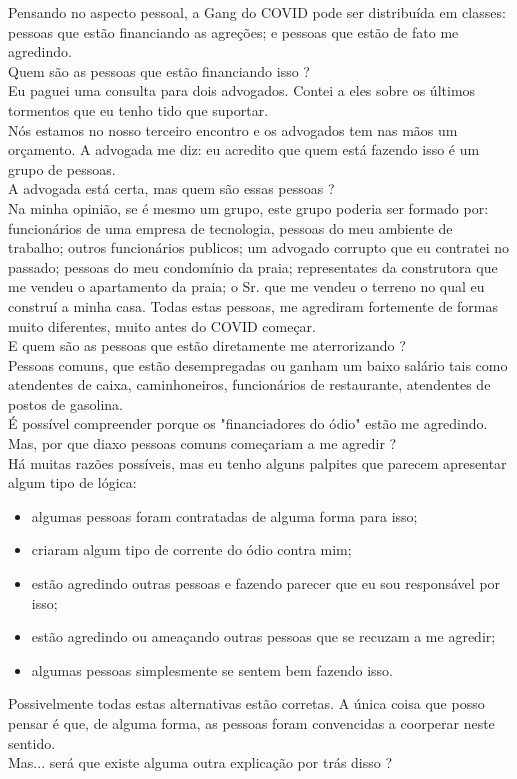 \documentclass[11pt]{book}
\begin{document}
Pensando no aspecto pessoal, a Gang do COVID pode ser distribuída em classes: pessoas que estão financiando as agreções; e pessoas que estão de fato me agredindo. \\

Quem são as pessoas que estão financiando isso ? \\

Eu paguei uma consulta para dois advogados. Contei a eles sobre os últimos tormentos que eu tenho tido que suportar. \\

Nós estamos no nosso terceiro encontro e os advogados tem nas mãos um orçamento. A advogada me diz: eu acredito que quem está fazendo isso é um grupo de pessoas. \\

A advogada está certa, mas quem são essas pessoas ? \\

Na minha opinião, se é mesmo um grupo, este grupo poderia ser formado por: funcionários de uma empresa de tecnologia, pessoas do meu ambiente de trabalho; outros funcionários publicos; um advogado corrupto que eu contratei no passado; pessoas do meu condomínio da praia; representates da construtora que me vendeu o apartamento da praia; o Sr. que me vendeu o terreno no qual eu construí a minha casa. Todas estas pessoas, me agrediram fortemente de formas muito diferentes, muito antes do COVID começar. \\

E quem são as pessoas que estão diretamente me aterrorizando ? \\

Pessoas comuns, que estão desempregadas ou ganham um baixo salário tais como atendentes de caixa, caminhoneiros, funcionários de restaurante, atendentes de postos de gasolina. \\

É possível compreender porque os "financiadores do ódio" estão me agredindo. Mas, por que diaxo pessoas comuns começariam a me agredir ?  \\

Há muitas razões possíveis, mas eu tenho alguns palpites que parecem apresentar algum tipo de lógica:

\begin{itemize}
\item algumas pessoas foram contratadas de alguma forma para isso;
\item criaram algum tipo de corrente do ódio contra mim;
\item estão agredindo outras pessoas e fazendo parecer que eu sou responsável por isso;
\item estão agredindo ou ameaçando outras pessoas que se recuzam a me agredir;
\item algumas pessoas simplesmente se sentem bem fazendo isso. 
\end{itemize}

Possivelmente todas estas alternativas estão corretas. A única coisa que posso pensar é que, de alguma forma, as pessoas foram convencidas a coorperar neste sentido. \\

Mas... será que existe alguma outra explicação por trás disso ?
\end{document}
